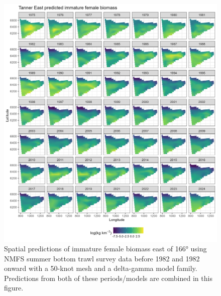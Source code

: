 \documentclass[
]{article}
\begin{document}
\begin{figure}

{\centering \includegraphics[width=1\linewidth,height=1\textheight]{../BAIRDI/Figures/TannerE_imfem_spatbio} 

}

\caption{Spatial predictions of immature female biomass east of 166° using NMFS summer bottom trawl survey data before 1982 and 1982 onward with a 50-knot mesh and a delta-gamma model family. Predictions from both of these periods/models are combined in this figure.}\label{fig:spatpred-bio-50-imfemE}
\end{figure}
\end{document}
